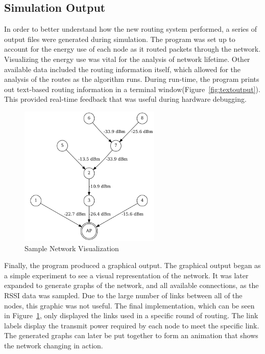 \documentclass{article}
\begin{document}
\subsection{Simulation Output}
In order to better understand how the new routing system performed, a series of output files were generated during simulation. The program was set up to account for the energy use of each node as it routed packets through the network. Visualizing the energy use was vital for the analysis of network lifetime. Other available data included the routing information itself, which allowed for the analysis of the routes as the algorithm runs. During run-time, the program prints out text-based routing information in a terminal window(Figure~\ref{fig:textoutput}). This provided real-time feedback that was useful during hardware debugging.

\begin{figure}[htb]
\begin{center}
\includegraphics[width=0.6\textwidth]{figures/networkgraph1.pdf}
\end{center}
\caption{Sample Network Visualization}
\label{fig:networkgraph1}
\end{figure}

Finally, the program produced a graphical output. The graphical output began as a simple experiment to see a visual representation of the network. It was later expanded to generate graphs of the network, and all available connections, as the RSSI data was sampled. Due to the large number of links between all of the nodes, this graphic was not useful. The final implementation, which can be seen in Figure~\ref{fig:networkgraph1}, only displayed the links used in a specific round of routing. The link labels display the transmit power required by each node to meet the specific link. The generated graphs can later be put together to form an animation that shows the network changing in action.
\end{document}
